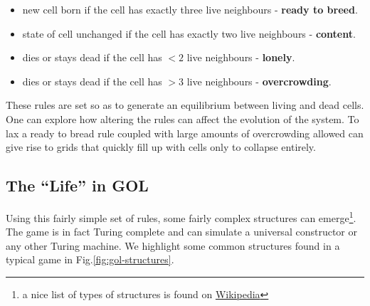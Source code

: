 \begin{itemize}
	\item {\color{ForestGreen}new cell born} if the cell has exactly three live neighbours - \textbf{\color{ForestGreen} ready to breed}.
	\item {\color{CornflowerBlue}state of cell unchanged} if the cell has exactly two live neighbours - \textbf{\color{CornflowerBlue}content}.
	\item {\color{Red}dies or stays dead} if the cell has $<2$ live neighbours - \textbf{\color{Red}lonely}.
	\item {\color{Red}dies or stays dead} if the cell has $>3$ live neighbours - \textbf{\color{Red}overcrowding}.
\end{itemize}

\par 
These rules are set so as to generate an equilibrium between living and dead cells. One can explore how altering the rules can affect the evolution of the system. To lax a {\color{ForestGreen} ready to bread} rule coupled with large amounts of {\color{Red}overcrowding allowed} can give rise to grids that quickly fill up with cells only to collapse entirely. 

\subsection{The ``Life'' in GOL} 
Using this fairly simple set of rules, some fairly complex structures can emerge\footnote{a nice list of types of structures is found on \href{https://en.wikipedia.org/wiki/Conway\%27s_Game_of_Life}{Wikipedia}}. The game is in fact Turing complete and can simulate a universal constructor or any other Turing machine. We highlight some common structures found in a typical game in Fig.\ref{fig:gol-structures}.

